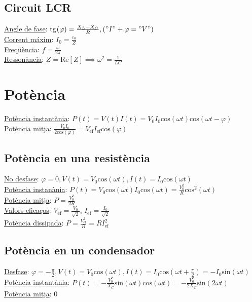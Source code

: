 \documentclass[12pt]{article}
\begin{document}
\begin{multicols}{4}
\subsection{Circuit LCR}

\underline{Angle de fase}: tg$(\varphi)=\frac{X_L-X_C}{R}, ("I" + \varphi = "V")$ \\
\underline{Corrent máxim}: $I_0 = \frac{\varepsilon_0}{Z}$ \\
\underline{Freqüència}: $f = \frac{\omega}{2\pi}$ \\
\underline{Ressonància}: $Z = \text{Re}[Z] \implies \omega^2 = \frac{1}{LC}$

\section{Potència}

\underline{Potència instantània}: $P(t) = V(t)I(t) = V_0I_0\text{cos}(\omega t)\text{cos}(\omega t - \varphi)$ \\
\underline{Potència mitja}: $\frac{V_0I_0}{2\text{cos}(\varphi)} = V_\text{ef}I_\text{ef}\text{cos}(\varphi)$

\subsection{Potència en una resistència}

\underline{No desfase}: $\varphi = 0, V(t) = V_0\text{cos}(\omega t), I(t) = I_0\text{cos}(\omega t)$ \\
\underline{Potència instanània}: $P(t) = V_0\text{cos}(\omega t)I_0\text{cos}(\omega t) = \frac{V_0^2}{R}\text{cos}^2(\omega t)$ \\
\underline{Potència mitja}: $P = \frac{V_0^2}{2R}$ \\
\underline{Valors eficaços}: $V_{\text{ef}} = \frac{V_0}{\sqrt{2}}$, $I_{\text{ef}} = \frac{I_0}{\sqrt{2}}$ \\
\underline{Potència dissipada}: $P = \frac{V_{\text{ef}}^2}{R} = RI_{\text{ef}}^2$

\subsection{Potència en un condensador}

\underline{Desfase}: $\varphi = -\frac{\pi}{2}, V(t) = V_0\text{cos}(\omega t), I(t) = I_0\text{cos}(\omega t + \frac{\pi}{2}) = -I_0\text{sin}(\omega t)$ \\
\underline{Potència instantània}: $P(t) = -\frac{V_0^2}{X_C}\text{sin}(\omega t)\text{cos}(\omega t) = -\frac{V_0^2}{2X_C}\text{sin}(2\omega t)$ \\
\underline{Potència mitja}: 0


\end{multicols}
\end{document}
